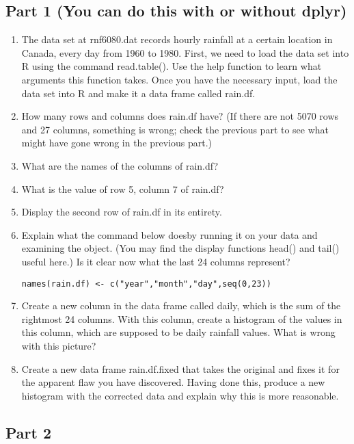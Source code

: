 \documentclass[]{article}
\begin{document}
\subsection{Part 1 (You can do this with or without
dplyr)}\label{part-1-you-can-do-this-with-or-without-dplyr}

\begin{enumerate}
\def\labelenumi{\arabic{enumi}.}
\item
  The data set at rnf6080.dat records hourly rainfall at a certain
  location in Canada, every day from 1960 to 1980. First, we need to
  load the data set into R using the command read.table(). Use the help
  function to learn what arguments this function takes. Once you have
  the necessary input, load the data set into R and make it a data frame
  called rain.df.
\item
  How many rows and columns does rain.df have? (If there are not 5070
  rows and 27 columns, something is wrong; check the previous part to
  see what might have gone wrong in the previous part.)
\item
  What are the names of the columns of rain.df?
\item
  What is the value of row 5, column 7 of rain.df?
\item
  Display the second row of rain.df in its entirety.
\item
  Explain what the command below doesby running it on your data and
  examining the object. (You may find the display functions head() and
  tail() useful here.) Is it clear now what the last 24 columns
  represent?

\begin{verbatim}
names(rain.df) <- c("year","month","day",seq(0,23))
\end{verbatim}
\item
  Create a new column in the data frame called daily, which is the sum
  of the rightmost 24 columns. With this column, create a histogram of
  the values in this column, which are supposed to be daily rainfall
  values. What is wrong with this picture?
\item
  Create a new data frame rain.df.fixed that takes the original and
  fixes it for the apparent flaw you have discovered. Having done this,
  produce a new histogram with the corrected data and explain why this
  is more reasonable.
\end{enumerate}

\subsection{Part 2}\label{part-2}
\end{document}
